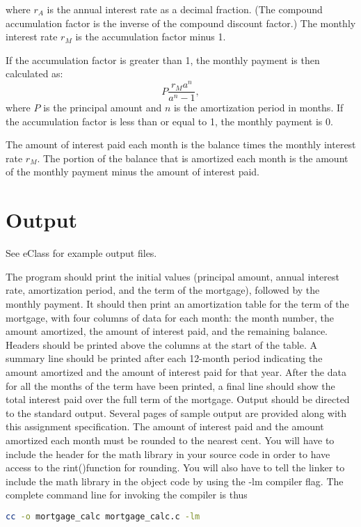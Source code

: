 \documentclass[12pt,info]{asg}
\begin{document}
where $r_A$ is the annual interest rate as a decimal fraction. (The compound accumulation factor is the inverse of the compound discount factor.) The monthly interest rate $r_M$ is the accumulation factor minus 1.

If the accumulation factor is greater than 1, the monthly payment is then calculated as:
\begin{equation}
P\frac{r_Ma^n}{a^n-1},
\end{equation}
where $P$ is the principal amount and $n$ is the amortization period in months. If the accumulation factor is less than or equal to 1, the monthly payment is 0.

The amount of interest paid each month is the balance times the monthly interest rate $r_M$. The portion of the balance that is amortized each month is the amount of the monthly payment minus the amount of interest paid.

\section*{Output}
See eClass for example output files.

The program should print the initial values (principal amount, annual interest rate, amortization period, and the term of the mortgage), followed by the monthly payment. It should then print an amortization table for the term of the mortgage, with four columns of data for each month: the month number, the amount amortized, the amount of interest paid, and the remaining balance. Headers should be printed above the columns at the start of the table. A summary line should be printed after each 12-month period indicating the amount amortized and the amount of interest paid for that year. After the data for all the months of the term have been printed, a final line should show the total interest paid over the full term of the mortgage. Output should be directed to the standard output. Several pages of sample output are provided along with this assignment specification.
The amount of interest paid and the amount amortized each month must be rounded to the nearest cent. You will have to include the header for the math library in your source code in order to have access to the rint()function for rounding. You will also have to tell the linker to include the math library in the object code by using the -lm compiler flag. The complete command line for invoking the compiler is thus
\begin{lstlisting}[language=bash]
cc -o mortgage_calc mortgage_calc.c -lm
\end{lstlisting}
\end{document}
